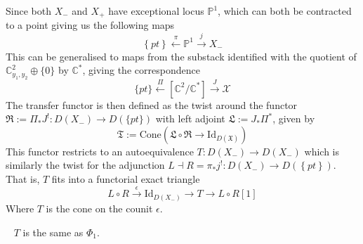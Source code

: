 Since both $X_-$ and $X_+$ have exceptional locus $\mathbb{P}^1$, which can both be contracted to a point giving us the following maps $$
\left\{ pt \right\} \xleftarrow{\pi} \mathbb{P}^{1}\xrightarrow{j} X_{-}
$$
This can be generalised to maps from the substack identified with the quotient of $\mathbb{C}^{2}_{y_{1}, y_{2}} \oplus \{ 0 \}$ by $\mathbb{C}^*$, giving the correspondence $$
\{ pt \}\xleftarrow{\Pi}[\mathbb{C}^{2}/\mathbb{C}^*] \xrightarrow{J} \mathcal{X}
$$
The transfer functor is then defined as the twist around the functor $\mathfrak{R}:= \Pi_{*}J^{!}: D(X_{-})\to D(\{ pt \})$  with left adjoint $\mathfrak{L}:= J_{*}\Pi^{*}$, given by $$
\mathfrak{T}:= \mathrm{Cone}\left(\mathfrak{L}\circ \mathfrak{R} \to \mathrm{Id}_{D(\mathfrak{X})} \right) 
$$
This functor restricts to an autoequivalence $T: D(X_{-})\to D(X_-)$ which is similarly the twist for the adjunction $L\dashv R= \pi_{*}j^{!} : D(X_{-})\to D(\left\{ pt \right\})$. That is, $T$ fits into a functorial exact triangle $$
L\circ R \xrightarrow{\epsilon} \mathrm{Id}_{D(X_{-})} \to T\to L\circ R[1]
$$Where $T$ is the cone on the counit $\epsilon$. 


\begin{theorem}{}{}
	~\cite*{donovan_window_2014} $T$ is the same as $\Phi_1$. 
\end{theorem}

